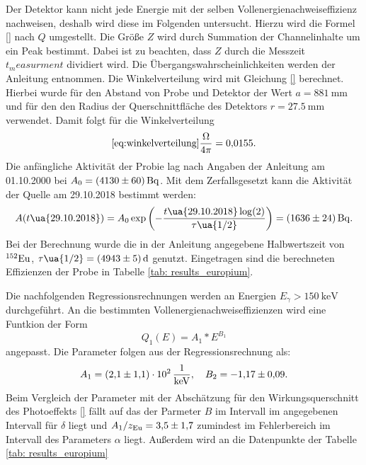 \FloatBarrier
Der Detektor kann nicht jede Energie mit der selben Vollenergienachweiseffizienz
nachweisen, deshalb wird diese im Folgenden untersucht. Hierzu wird die Formel
\eqref{} nach $Q$ umgestellt. Die Größe $Z$ wird durch Summation der Channelinhalte
um ein Peak bestimmt. Dabei ist zu beachten, dass $Z$ durch die Messzeit $t_measurment$
dividiert wird. Die Übergangswahrscheinlichkeiten werden der Anleitung \cite{anleitungV18}
entnommen. Die Winkelverteilung wird mit Gleichung \eqref{} berechnet. Hierbei wurde
für den Abstand von Probe und Detektor der Wert $a=\SI{881}{\milli\meter}$ und für den
den Radius der Querschnittfläche des Detektors $r=\SI{27.5}{\milli\meter}$
verwendet. Damit folgt für die Winkelverteilung
\begin{equation}
  \eqref{eq:winkelverteilung}
  \frac{\Omega}{4\pi}=\num{0.0155}.
\end{equation}
Die anfängliche Aktivität der Probie lag nach Angaben der Anleitung \cite{anleitungV18}
am 01.10.2000 bei $A_0=\SI{4130\pm60}{\becquerel}$. Mit dem Zerfallsgesetzt kann die
Aktivität der Quelle am 29.10.2018 bestimmt werden:
\begin{equation}
  A(t\ua{29.10.2018})=A_0\exp\left(-\frac{t\ua{29.10.2018}\log(2)}{\tau\ua{1/2}}\right) = \SI{1636\pm24}{\becquerel}.
\end{equation}
Bei der Berechnung wurde die in der Anleitung \cite{anleitungV18} angegebene
Halbwertszeit von $^{152}\ce{Eu}$, $\tau\ua{1/2}=\SI{4943 \pm 5 }{\day}$ genutzt.
Eingetragen sind die berechneten Effizienzen der Probe in Tabelle \ref{tab: results_europium}.

Die nachfolgenden Regressionsrechnungen werden an Energien $E_\gamma>\SI{150}{\kilo\eV}$
durchgeführt.
An die bestimmten Vollenergienachweiseffizienzen wird eine Funtkion der Form
\begin{equation*}
  Q_1(E)=A_1*E^{B_1}
\end{equation*}
angepasst. Die Parameter folgen aus der Regressionsrechnung als:
\begin{equation}
\label{eq:effizienz_Q_1}
A_1 = \SI{2.1\pm1.1 e2}{\per\kilo\eV}, \quad B_2=\num{-1.17\pm 0.09}.
\end{equation}
Beim Vergleich der Parameter mit der Abschätzung für den Wirkungsquerschnitt
des Photoeffekts \eqref{} fällt auf das der Parmeter $B$ im Intervall im angegebenen
Intervall für $\delta$ liegt und $A_1/z_{\ce{Eu}}=\num{3.5\pm1.7}$ zumindest im
Fehlerbereich im Intervall des Parameters $\alpha$ liegt.
Außerdem wird an die Datenpunkte der Tabelle \ref{tab: results_europium}
